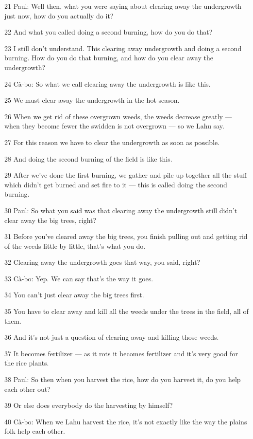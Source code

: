 {21 Paul: Well then, what you were saying about clearing away the undergrowth
just now, how do you actually do it?}

{22 And what you called doing a second burning, how do you do that?}

{23 I still don't understand. This clearing away undergrowth and doing a
second burning. How do you do that burning, and how do you clear away the undergrowth?}

{24 Cà-bo: So what we call clearing away the undergrowth is like this.}

{25 We must clear away the undergrowth in the hot season.}

{26 When we get rid of these overgrown weeds, the weeds decrease greatly
--- when they become fewer the swidden is not overgrown --- so we Lahu say.}

{27 For this reason we have to clear the undergrowth as soon as possible.}

{28 And doing the second burning of the field is like this.}

{29 After we've done the first burning, we gather and pile up together all
the stuff which didn't get burned and set fire to it --- this is called doing the
second burning.}

{30 Paul: So what you said was that clearing away the undergrowth still
didn't clear away the big trees, right?}

{31 Before you've cleared away the big trees, you finish pulling out and
getting rid of the weeds little by little, that's what you do.}

{32 Clearing away the undergrowth goes that way, you said, right?}

{33 Cà-bo: Yep. We can say that's the way it goes.}

{34 You can't just clear away the big trees first.}

{35 You have to clear away and kill all the weeds under the trees in the
field, all of them.}

{36 And it's not just a question of clearing away and killing those weeds.}

{37 It becomes fertilizer --- as it rots it becomes fertilizer and it's
very good for the rice plants.}

{38 Paul: So then when you harvest the rice, how do you harvest it, do you
help each other out?}

{39 Or else does everybody do the harvesting by himself?}

{40 Cà-bo: When we Lahu harvest the rice, it's not exactly like the way
the plains folk help each other.}

